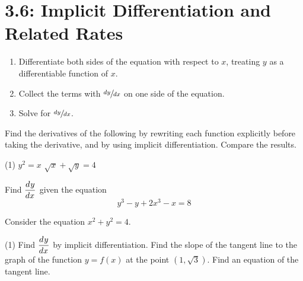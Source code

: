 \documentclass[../mathNotesPreamble]{subfiles}
\providecommand{\relscalefact}{1.4}
\begin{document}
\relscale{\relscalefact}
  \section{3.6: Implicit Differentiation and Related Rates}

  \pagebreak

  \begin{thmBox*}
    \begin{enumerate}
      \item Differentiate both sides of the equation with respect to $x$, treating $y$ as a \newline differentiable function of $x$.
      \item Collect the terms with $\sfrac{dy}{dx}$ on one side of the equation.
      \item Solve for $\sfrac{dy}{dx}$.
    \end{enumerate}
  \end{thmBox*}
  \begin{ex*}
    Find the derivatives of the following by rewriting each function explicitly before taking the derivative, and by using implicit differentiation. Compare the results.
  \end{ex*}
  \begin{extasks}[after-item-skip=\stretch{1}](1)
    \task $y^2=x$
    \task $\sqrt x+\sqrt y=4$
  \end{extasks}
  \pagebreak

  \begin{ex*}
    Find $\displaystyle{\frac{d^{}y}{dx^{}}}$ given the equation
    \[y^3-y+2x^3-x=8\]
  \end{ex*}
  \pagebreak

  \begin{ex*}
    Consider the equation $x^2+y^2=4$.
  \end{ex*}
  \begin{extasks}[after-item-skip=\stretch{1}](1)
    \task Find $\displaystyle{\frac{d^{}y}{dx^{}}}$ by implicit differentiation.
    \task Find the slope of the tangent line to the graph of the function $y=f(x)$ at the point $(1,\sqrt{3})$.
    \task Find an equation of the tangent line.
  \end{extasks}
  \pagebreak
\end{document}
